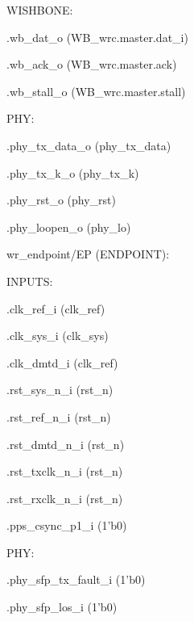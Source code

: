 \begin{dig}
\begin{dig}
\begin{dig}
        \item WISHBONE:
            \begin{dig}
            \item .wb\_dat\_o                   (WB\_wrc.master.dat\_i)
            \item .wb\_ack\_o                   (WB\_wrc.master.ack)
            \item .wb\_stall\_o                 (WB\_wrc.master.stall)
            \end{dig}
        \item PHY:
            \begin{dig}
            \item .phy\_tx\_data\_o              (phy\_tx\_data)
            \item .phy\_tx\_k\_o                 (phy\_tx\_k)
            \item .phy\_rst\_o                  (phy\_rst)
            \item .phy\_loopen\_o               (phy\_lo)
            \end{dig}
        \end{dig}
    \end{dig}
\item wr\_endpoint/EP (ENDPOINT):
    \begin{dig}
    \item INPUTS:
        \begin{dig}
        \item .clk\_ref\_i                  (clk\_ref)
        \item .clk\_sys\_i                  (clk\_sys)
        \item .clk\_dmtd\_i                 (clk\_ref)
        \item .rst\_sys\_n\_i                (rst\_n)
        \item .rst\_ref\_n\_i                (rst\_n)
        \item .rst\_dmtd\_n\_i               (rst\_n)
        \item .rst\_txclk\_n\_i              (rst\_n)
        \item .rst\_rxclk\_n\_i              (rst\_n)
        \item .pps\_csync\_p1\_i             (1'b0)
        \item PHY:
            \begin{dig}
            \item .phy\_sfp\_tx\_fault\_i         (1'b0)
            \item .phy\_sfp\_los\_i              (1'b0)

\end{dig}
\end{dig}
\end{dig}
\end{dig}
